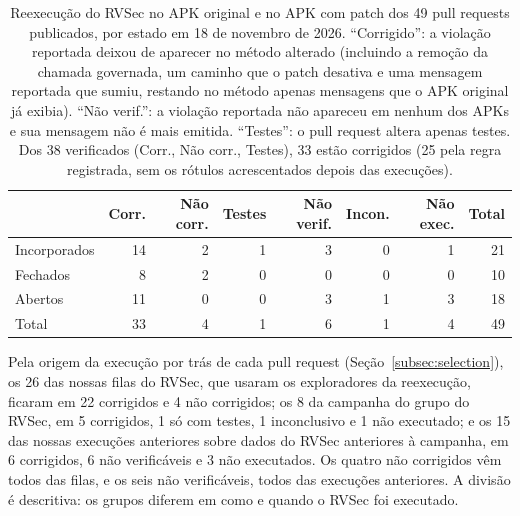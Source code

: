 \documentclass[conference]{IEEEtran}
\begin{document}
\begin{table}[H]
\centering
\caption{Reexecução do RVSec no APK original e no APK com patch dos 49 pull requests
publicados, por estado em 18 de novembro de 2026. ``Corrigido'': a violação reportada
deixou de aparecer no método alterado (incluindo a remoção da chamada
governada, um caminho que o patch desativa e uma mensagem reportada que sumiu, restando no método
apenas mensagens que o APK original já exibia). ``Não verif.'':
a violação reportada não apareceu em nenhum dos APKs e sua mensagem não é mais
emitida. ``Testes'': o pull request altera apenas testes. Dos 38 verificados (Corr., Não corr., Testes),
33 estão corrigidos (25 pela regra registrada, sem os rótulos acrescentados depois das execuções).}
\label{tab:dynval}
\footnotesize
\setlength{\tabcolsep}{2pt}
\begin{tabular}{lrrrrrrr}
\toprule
 & Corr. & Não corr. & Testes & Não verif. & Incon. & Não exec. & Total \\
\midrule
Incorporados & 14 & 2 & 1 & 3 & 0 & 1 & 21 \\
Fechados     & 8 & 2 & 0 & 0 & 0 & 0 & 10 \\
Abertos      & 11 & 0 & 0 & 3 & 1 & 3 & 18 \\
\midrule
Total        & 33 & 4 & 1 & 6 & 1 & 4 & 49 \\
\bottomrule
\end{tabular}
\end{table}

Pela origem da execução por trás de cada pull request
(Seção~\ref{subsec:selection}), os 26 das nossas filas do RVSec, que usaram os
exploradores da reexecução, ficaram em 22 corrigidos e 4 não corrigidos; os 8 da
campanha do grupo do RVSec, em 5 corrigidos, 1 só com testes, 1 inconclusivo e 1
não executado; e os 15 das nossas execuções anteriores sobre dados do RVSec
anteriores à campanha, em 6 corrigidos, 6 não verificáveis e 3 não executados.
Os quatro não corrigidos vêm todos das filas, e os seis não verificáveis, todos
das execuções anteriores. A divisão é descritiva: os grupos diferem em como e
quando o RVSec foi executado.
\end{document}
